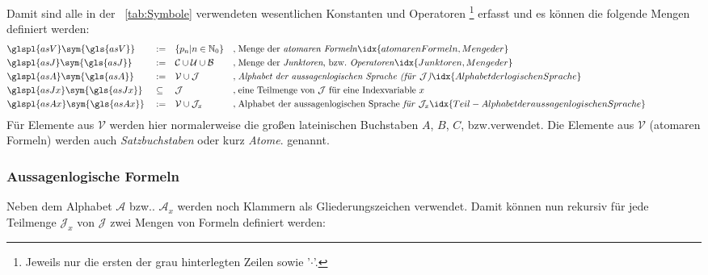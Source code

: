 \documentclass[english,ngerman,parskip=half,headsepline,footsepline,
	fleqn,notitlepage]{scrreprt}
\makeatletter
\newcommand*{\defeq}{:=}%
\newcommand*{\lmult}{\cdot}
\newcommand*{\gsNo}{\mathbb{N}_0}%
\newcommand*{\asA}{\mathcal{A}}%
\newcommand*{\asAx}{\mathcal{A}_x}%
\newcommand*{\asB}{\mathcal{B}}%
\newcommand*{\asC}{\mathcal{C}}%
\newcommand*{\asJ}{\mathcal{J}}%
\newcommand*{\asJx}{\mathcal{J}_x}%
\newcommand*{\asU}{\mathcal{U}}%
\newcommand*{\asV}{\mathcal{V}}%
\newcommand*{\formulatoleft}{&&&&&&&&&&}%
\newcommand*{\charqt}[1]{'#1'}%
\newcommand*{\symqt}[1]{\charqt{#1}}%
\newcommand*{\textbzw}{bzw.\@ }
\newcommand*{\Idx}[1]{#1\idx{#1}}%
\newcommand*{\glsSym}[1]{\glspl{#1}\sym{\gls{#1}}}%
\makeatother
\begin{document}
	Damit sind alle in der \tablename~\vref{tab:Symbole} verwendeten wesentlichen Konstanten und Operatoren%
	\footnote{%
		Jeweils nur die ersten der grau hinterlegten Zeilen sowie \symqt{$\lmult$}.%
	}
	erfasst und es können die folgende Mengen definiert werden:
	\begin{align}
		& \glsSym{asV}  & & \defeq    & & \{ p_n | n \in \gsNo \}
		& ,\; & \text{Menge der \emph{atomaren Formeln}}
		\idx{atomaren Formeln, Menge der}         \label{def:V}  \\
		& \glsSym{asJ}  & & \defeq    & &\asC \cup \asU \cup \asB
		& ,\; & \text{Menge der \emph{Junktoren}, \textbzw \emph{Operatoren}}
		\idx{Junktoren, Menge der}                \label{def:J}  \\
		& \glsSym{asA}  & & \defeq    & & \asV \cup \asJ
		& ,\; & \text{\emph{Alphabet der aussagenlogischen Sprache (für }} \asJ
		\text{\emph{)}}
		\idx{Alphabet der logischen Sprache}      \label{def:A}  \\
		& \glsSym{asJx} & & \subseteq & & \asJ
		& ,\; & \text{eine Teilmenge von } \asJ \text{ für eine Indexvariable }
		x                                         \label{def:Bx} \\
		& \glsSym{asAx} & & \defeq    & & \asV \cup \asJx \quad
		& ,\; & \text{Alphabet der aussagenlogischen Sprache \emph{für} } \asJx
		\idx{Teil-Alphabet der aussagenlogischen Sprache} \label{def:Ax}
		\formulatoleft
	\end{align}
	Für Elemente aus $\asV$ werden hier normalerweise die großen lateinischen Buchstaben $A$, $B$, $C$, \textbzw verwendet.
	Die Elemente aus $\asV$ (atomaren Formeln) werden auch \emph{\Idx{Satzbuchstabe}}\emph{n} oder kurz \emph{\Idx{Atom}}\emph{e}. genannt.

	\subsubsection{Aussagenlogische Formeln}%
	\label{subsub:Formeln}

	Neben dem Alphabet $\asA$ \textbzw. $\asAx$ werden noch Klammern als Gliederungszeichen verwendet.
	Damit können nun rekursiv für jede Teilmenge $\asJx$ von $\asJ$ zwei Mengen von Formeln definiert werden:
\end{document}
